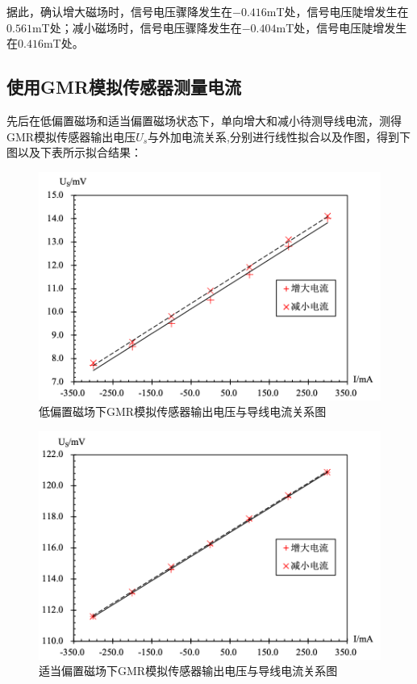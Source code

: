 \documentclass{thuemp}
\begin{document}
据此，确认增大磁场时，信号电压骤降发生在$-0.416$\si{\milli\tesla}处，信号电压陡增发生在$0.561$\si{\milli\tesla}处；减小磁场时，信号电压骤降发生在$-0.404$\si{\milli\tesla}处，信号电压陡增发生在$0.416$\si{\milli\tesla}处。


\subsection{使用GMR模拟传感器测量电流}

先后在低偏置磁场和适当偏置磁场状态下，单向增大和减小待测导线电流，测得GMR模拟传感器输出电压$U_s$与外加电流关系,分别进行线性拟合以及作图，得到下图以及下表所示拟合结果：

\begin{figure}[H]
    \centering
    \includegraphics[width=0.9\linewidth]{../Data/GMR-Plot-04-01-excel.png}
    \caption{低偏置磁场下GMR模拟传感器输出电压与导线电流关系图} \label{fig:gmr_current_low}
\end{figure}

\begin{figure}[H]
    \centering
    \includegraphics[width=0.9\linewidth]{../Data/GMR-Plot-04-02-excel.png}
    \caption{适当偏置磁场下GMR模拟传感器输出电压与导线电流关系图} \label{fig:gmr_current}
\end{figure}
\end{document}
